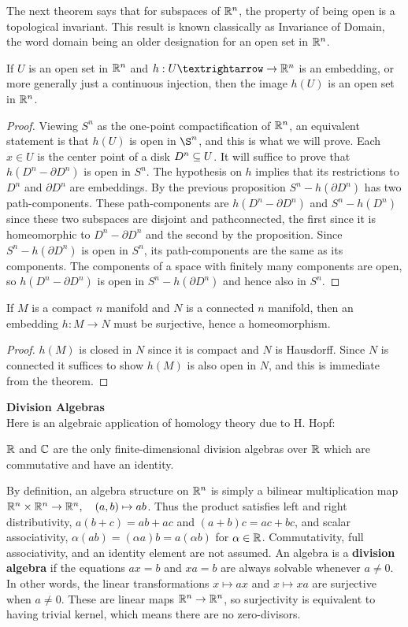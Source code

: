 The next theorem says that for subspaces of $\mathbb{R}^n$, the property of being open is a topological invariant. This result is known classically as Invariance of Domain, the word domain being an older designation for an open set in $\mathbb{R}^n$.
\begin{theorem}
If $U$ is an open set in $\mathbb{R}^n$ and $h:U→\to\R^n$ is an embedding, or more generally just a continuous injection, then the image $h(U)$ is an open set in $\mathbb{R}^n$.
\end{theorem}
\begin{proof}
Viewing $S^n$ as the one-point compactification of $\mathbb{R}^n$, an equivalent statement is that $h(U)$ is open in $\S^n$, and this is what we will prove. Each $x\in U$ is the center point of a disk $D^n\subseteq U$. It will suffice to prove that $h(D^n-\partial D^n)$ is open in $S^n$. The hypothesis on $h$ implies that its restrictions to $D^n$ and $\partial D^n$ are embeddings. By the
previous proposition $S^n-h(\partial D^n)$ has two path-components. These path-components are $h(D^n-\partial D^n)$ and $S^n-h(D^n)$ since these two subspaces are disjoint and pathconnected, the first since it is homeomorphic to $D^n-\partial D^n$ and the second by the proposition. Since $S^n-h(\partial D^n)$ is open in $S^n$, its path-components are the same as its components. The components of a space with finitely many components are open, so $h(D^n-\partial D^n)$ is open in $S^n-h(\partial D^n)$ and hence also in $S^n$.
\end{proof}
\begin{corollary}\label{embedding to homeo}
If $M$ is a compact $n$ manifold and $N$ is a connected $n$ manifold, then an embedding $h:M\to N$ must be surjective, hence a homeomorphism.
\end{corollary}
\begin{proof}
$h(M)$ is closed in $N$ since it is compact and $N$ is Hausdorff. Since $N$ is
connected it suffices to show $h(M)$ is also open in $N$, and this is immediate from the theorem.
\end{proof}
\textbf{Division Algebras}\\
Here is an algebraic application of homology theory due to H. Hopf:
\begin{theorem}
$\mathbb{R}$ and $\mathbb{C}$ are the only finite-dimensional division algebras over $\mathbb{R}$ which are commutative and have an identity.
\end{theorem}
By definition, an algebra structure on $\mathbb{R}^n$ is simply a bilinear multiplication map $\mathbb{R}^n\times\mathbb{R}^n\to\mathbb{R}^n,\quad(a,b)\mapsto ab$. Thus the product satisfies left and right distributivity, $a(b+c)=ab+ac$ and $(a+b)c=ac+bc$, and scalar associativity, $\alpha(ab)=(\alpha a)b=a(\alpha b)$ for $\alpha\in\mathbb{R}$. Commutativity, full associativity, and an identity element are not assumed. An algebra is a \textbf{division algebra} if the equations $ax=b$ and $xa=b$ are always solvable whenever $a\neq0$. In other words, the linear transformations $x\mapsto ax$ and $x\mapsto xa$ are surjective when $a\neq0$. These are linear maps $\mathbb{R}^n\to\mathbb{R}^n$, so surjectivity is equivalent to having trivial kernel, which means there are no zero-divisors.\par
